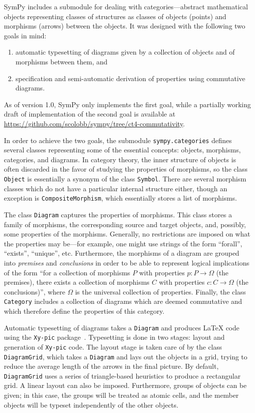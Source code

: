 SymPy includes a submodule for dealing with categories---abstract mathematical
objects representing classes of structures as classes of objects (points) and
morphisms (arrows) between the objects. It was
designed with the following two goals in mind:

\begin{enumerate}
\item automatic typesetting of diagrams given by a collection of
  objects and of morphisms between them, and
\item specification and semi-automatic derivation of properties
  using commutative diagrams.
\end{enumerate}

As of version 1.0, SymPy only implements the first goal, while a partially
working draft of implementation of the second goal is available at
\url{https://github.com/scolobb/sympy/tree/ct4-commutativity}.

In order to achieve the two goals, the submodule \texttt{sympy.categories} defines
several classes representing some of the essential concepts: objects, morphisms,
categories, and diagrams.  In category theory, the inner structure of objects is
often discarded in the favor of studying the properties of morphisms, so the
class \texttt{Object} is essentially a synonym of the class \texttt{Symbol}.
There are several morphism classes which do not have a particular internal
structure either, though an exception is \texttt{CompositeMorphism}, which
essentially stores a list of morphisms.

The class \texttt{Diagram} captures the properties of morphisms. This class
stores a family of morphisms, the corresponding source and target objects,
and, possibly, some properties of the morphisms. Generally, no restrictions
are imposed on what the properties may be---for example, one might use strings
of the form ``forall'', ``exists'', ``unique'', etc. Furthermore, the
morphisms of a diagram are grouped into \textit{premises} and
\textit{conclusions} in order to be able to represent logical implications of
the form ``for a collection of morphisms $P$ with properties $p:P\to \Omega$
(the premises), there exists a collection of morphisms $C$ with properties
$c:C\to \Omega$ (the conclusions)'', where $\Omega$ is the universal
collection of properties. Finally, the class \texttt{Category} includes a
collection of diagrams which are deemed commutative and which therefore define
the properties of this category.

Automatic typesetting of diagrams takes a \texttt{Diagram} and produces \LaTeX{}
code using the \texttt{Xy-pic} package~\cite{rose1999xy}.  Typesetting is done in two stages:
layout and generation of \texttt{Xy-pic} code.  The layout stage is taken care
of by the class \texttt{DiagramGrid}, which takes a \texttt{Diagram} and lays out
the objects in a grid, trying to reduce the average length of the arrows in the
final picture.  By default, \texttt{DiagramGrid} uses a series of triangle-based
heuristics to produce a rectangular grid.  A linear layout can also be imposed.
Furthermore, groups of objects can be given; in this case, the groups will be
treated as atomic cells, and the member objects will be typeset independently of
the other objects.

